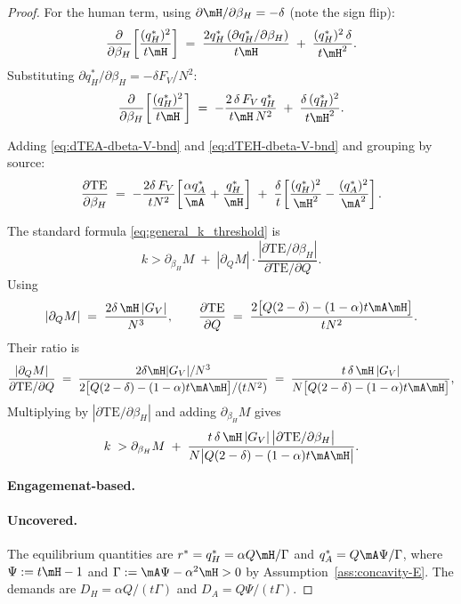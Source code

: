 \begin{proof}
For the human term, using $\partial\mH/\partial\beta_H = -\delta$ (note the sign flip):
\[
\frac{\partial}{\partial\beta_H}\!\left[\frac{(q_H^*)^2}{t\mH}\right]
\;=\; \frac{2 q_H^*\,(\partial q_H^*/\partial\beta_H)}{t\mH}
\;+\; \frac{(q_H^*)^2\,\delta}{t\mH^2}.
\]
Substituting $\partial q_H^*/\partial\beta_H = -\delta F_V/N^2$:
\begin{equation}\label{eq:dTEH-dbeta-V-bnd}
\frac{\partial}{\partial\beta_H}\!\left[\frac{(q_H^*)^2}{t\mH}\right]
\;=\; -\frac{2\,\delta\,F_V\,q_H^*}{t\mH\,N^2}
\;+\; \frac{\delta\,(q_H^*)^2}{t\mH^2}.
\end{equation}

Adding \eqref{eq:dTEA-dbeta-V-bnd} and \eqref{eq:dTEH-dbeta-V-bnd} and grouping by source:
\[
\frac{\partial\text{TE}}{\partial\beta_H}
\;=\; -\frac{2\delta\,F_V}{tN^2}\!\left[\frac{\alpha q_A^*}{\mA} + \frac{q_H^*}{\mH}\right]
\;+\; \frac{\delta}{t}\!\left[\frac{(q_H^*)^2}{\mH^2} - \frac{(q_A^*)^2}{\mA^2}\right].
\]


The standard formula \eqref{eq:general_k_threshold} is
\[
 k>\partial_{\beta_H}M
\;+\; \left|\partial_QM\right|\cdot
\frac{|\partial\text{TE}/\partial\beta_H|}{\partial\text{TE}/\partial Q}.
\]
Using
\[
\left|\partial_Q M\right|
\;=\; \frac{2\delta\,\mH\,|G_V|}{N^3},
\qquad
\frac{\partial\text{TE}}{\partial Q}
\;=\; \frac{2\bigl[Q(2-\delta) - (1-\alpha)t\mA\mH\bigr]}{t N^2}.
\]
Their ratio is
\[
\frac{|\partial_Q M|}{\partial\text{TE}/\partial Q}
\;=\; \frac{2\delta\mH|G_V|/N^3}{2\bigl[Q(2-\delta) - (1-\alpha)t\mA\mH\bigr]/(tN^2)}
\;=\; \frac{t\,\delta\,\mH\,|G_V|}{N\bigl[Q(2-\delta) - (1-\alpha)t\mA\mH\bigr]},
\]
Multiplying by $|\partial\text{TE}/\partial\beta_H|$ and adding $\partial_{\beta_H}M$ gives
\begin{equation}\label{eq:kbar-Q-TE-V-bnd}
k \;> \partial_{\beta_H}M
\;+\; \frac{t\,\delta\,\mH\,|G_V|\,\bigl|\partial\text{TE}/\partial\beta_H\bigr|}{N\bigl|Q(2-\delta) - (1-\alpha)t\mA\mH\bigr|}.
\end{equation}


\textbf{Engagemenat-based.}
\paragraph{Uncovered.}

The equilibrium quantities are $r^* = q_H^* = \alpha Q\mH/\Gamma$ and $q_A^* = Q\mA\Psi/\Gamma$, where $\Psi := t\mH - 1$ and $\Gamma := \mA\Psi - \alpha^2\mH > 0$ by Assumption~\ref{ass:concavity-E}. The demands are $D_H = \alpha Q/(t\Gamma)$ and $D_A = Q\Psi/(t\Gamma)$.


\end{proof}
